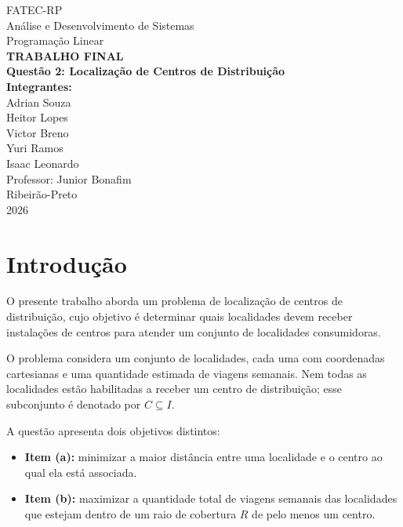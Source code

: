 \documentclass[12pt,a4paper]{article}
\begin{document}
\begin{titlepage}
    \begin{center}
        {\large FATEC-RP}\\[0.5cm]
        {\large Análise e Desenvolvimento de Sistemas}\\[0.5cm]
        {\large Programação Linear}\\[2.5cm]
        {\Large \textbf{TRABALHO FINAL}}\\[0.5cm]
        {\large \textbf{Questão 2: Localização de Centros
        de Distribuição}}\\[3cm]
        \textbf{Integrantes:}\\[0.3cm]
        Adrian Souza\\
        Heitor Lopes\\
        Victor Breno\\
        Yuri Ramos\\
        Isaac Leonardo\\[2cm]
        Professor: Junior Bonafim\\[3cm]
        Ribeirão-Preto\\
        2026
    \end{center}
\end{titlepage}

\tableofcontents
\newpage

\section{Introdução}

O presente trabalho aborda um problema de localização de
centros de distribuição, cujo objetivo é determinar quais
localidades devem receber instalações de centros para atender
um conjunto de localidades consumidoras.

O problema considera um conjunto de localidades, cada uma
com coordenadas cartesianas e uma quantidade estimada de
viagens semanais. Nem todas as localidades estão habilitadas
a receber um centro de distribuição; esse subconjunto é
denotado por $C \subseteq I$.

A questão apresenta dois objetivos distintos:

\begin{itemize}
    \item \textbf{Item (a):} minimizar a maior distância entre
    uma localidade e o centro ao qual ela está associada.
    \item \textbf{Item (b):} maximizar a quantidade total de
    viagens semanais das localidades que estejam dentro de um
    raio de cobertura $R$ de pelo menos um centro.
\end{itemize}
\end{document}
